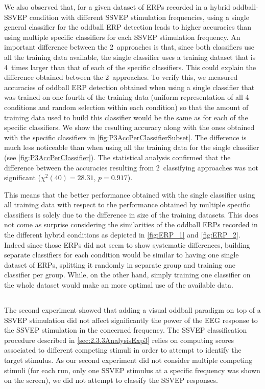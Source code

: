 \documentclass[10pt]{article}
\begin{document}
    We also observed that, for a given dataset of ERPs recorded in a hybrid oddball-SSVEP condition with different SSVEP stimulation frequencies, using a single general classifier for the oddball ERP detection leads to higher accuracies than using multiple specific classifiers for each SSVEP stimulation frequency.
    An important difference between the 2~approaches is that, since both classifiers use all the training data available, the single classifier uses a training dataset that is 4~times larger than that of each of the specific classifiers.
    This could explain the difference obtained between the 2~approaches.
    To verify this, we measured accuracies of oddball ERP detection obtained when using a single classifier that was trained on one fourth of the training data (uniform representation of all 4 conditions and random selection within each condition) so that the amount of training data used to build this classifier would be the same as for each of the specific classifiers.
    We show the resulting accuracy along with the ones obtained with the specific classifiers in \autoref{fig:P3AccPerClassifierSubset}.
    The difference is much less noticeable than when using all the training data for the single classifier (see \autoref{fig:P3AccPerClassifier}).
    The statistical analysis confirmed that the difference between the accuracies resulting from 2~classifying approaches was not significant ($\chi^2(40)=28.31$, $p=0.917$).

    This means that the better performance obtained with the single classifier using all training data with respect to the performance obtained by multiple specific classifiers is solely due to the difference in size of the training datasets.
    This does not come as surprise considering the similarities of the oddball ERPs recorded in the different hybrid conditions as depicted in \autoref{fig:ERP_1} and \autoref{fig:ERP_2}.
    Indeed since those ERPs did not seem to show systematic differences, building separate classifiers for each condition would be similar to having one single dataset of ERPs, splitting it randomly in separate group and training one classifier per group.
    While, on the other hand, simply training one classifier on the whole dataset would make an more optimal use of the available data.

    \subsection{}
    \label{sec:4Discuss2}
    The second experiment showed that adding a visual oddball paradigm on top of a SSVEP stimulation did not affect significantly the power of the EEG response to the SSVEP stimulation in the concerned frequency.
    The SSVEP classification procedure described in \autoref{sec:2.3.3AnalysisExp3} relies on computing scores associated to different competing stimuli in order to attempt to identify the target stimulus.
    As our second experiment did not consider multiple competing stimuli (for each run, only one SSVEP stimulus at a specific frequency was shown on the screen), we did not attempt to classify the SSVEP responses.
\end{document}
